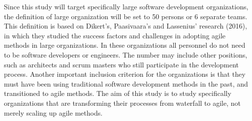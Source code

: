 Since this study will target specifically large software development
organizations, the definition of large organization will be set to 50
persons or 6 separate teams. This definition is based on Dikert's,
Paasivaara's and Lassenius' research (2016), in which they studied
the success factors and challenges in adopting agile methods in large
organizations. In these organizations all personnel do not need to
be software developers or engineers. The number may include other
positions, such as architects and scrum masters who still participate
in the development process. Another important inclusion criterion for
the organizations is that they must have been using traditional software
development methods in the past, and transitioned to agile methods.
The aim of this study is to study specifically organizations that are
transforming their processes from waterfall to agile, not merely scaling
up agile methods.
